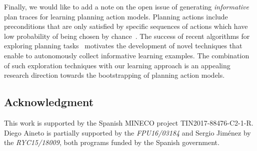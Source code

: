 \documentclass[3p,times]{elsarticle}
\newcommand{\strips}{\textsc{Strips}}     %
\newcommand{\ARMS}{{\small {\sffamily ARMS}}\xspace}
\newcommand{\FAMA}{{\small {\sffamily FAMA}}\xspace}
\begin{document}
Finally, we would like to add a note on the open issue of generating {\em informative} plan traces for learning planning action models. Planning actions include preconditions that are only satisfied by specific sequences of actions which have low probability of being chosen by chance~\cite{fern2004learning}. The success of recent algorithms for exploring planning tasks~\cite{FrancesRLG17} motivates the development of novel techniques that enable to autonomously collect informative learning examples. The combination of such exploration techniques with our learning approach is an appealing research direction towards the bootstrapping of planning action models.










\subsection*{Acknowledgment}
This work is supported by the Spanish MINECO project TIN2017-88476-C2-1-R. Diego Aineto is partially supported by the {\it FPU16/03184} and Sergio Jim\'enez by the {\it RYC15/18009}, both programs funded by the Spanish government.
\end{document}
